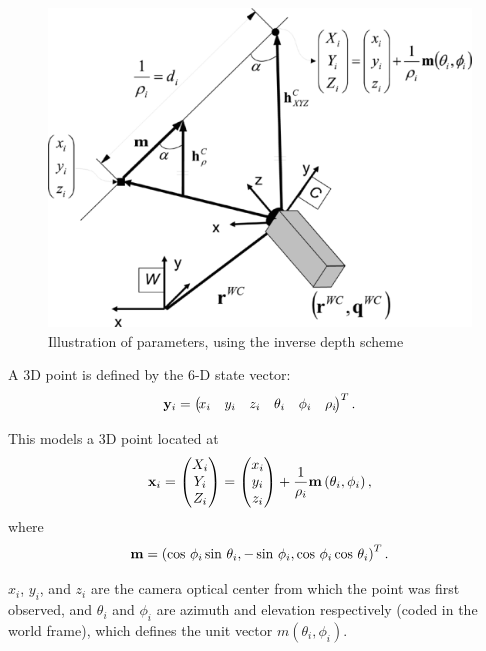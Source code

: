 \documentclass[twoside]{article}
\begin{document}
\begin{figure}[h]
\includegraphics[scale=0.3]{inverse-parametrization.png}
\centering
\caption{Illustration of parameters, using the inverse depth scheme}
\end{figure}

A 3D point is defined by the 6-D state vector:
\begin{equation}
{\bf y}_i = \left(\!\begin{matrix}x_i & y_i & z_i & \theta_i & \phi_i & \rho_i\end{matrix}\!\right)^T.
\end{equation}

This models a 3D point located at 
\begin{equation}
{\bf x}_i = \left(\begin{matrix}X_i \cr Y_i \cr Z_i\end{matrix}\right) = 
\left(\begin{matrix}x_i \cr y_i \cr z_i\end{matrix}\right)+ {1 \over \rho_i}{\bf m}\left(\theta_i, \phi_i\right),
\end{equation}
where
\begin{equation}
{\bf m} = \left(\cos\,\phi_i \sin\,\theta_i,-\sin\,\phi_i, \cos\,\phi_i \cos\,\theta_i\right)^T.
\end{equation}

$x_i$, $y_i$, and $z_i$ are the camera optical center from which the point was first observed, and $\theta_i$ and $\phi_i$ are azimuth and elevation respectively (coded in the world frame), which defines the unit vector $m(\theta_i, \phi_i)$.
\end{document}
